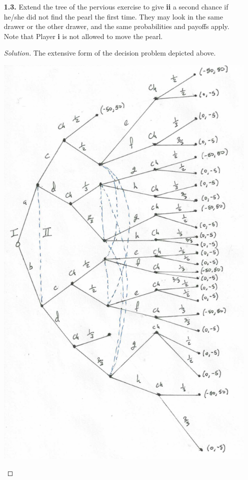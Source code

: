 \documentclass[ 12pt ]{article}
\begin{document}
\begin{enumerate}
\begin{enumerate}
			\item[\textbf{1.3.}] Extend the tree of the pervious exercise to give \textbf{ii} a second chance if he/she did not find the pearl the first time. They may look in the same
				drawer or the other drawer, and the same probabilities and payoffs apply. Note that Player \textbf{i} is not allowed to move the pearl.
				\begin{proof}[Solution]
					The extensive form of the decision problem depicted above.
					\begin{center}
					\includegraphics{tree2}
					\end{center}
				\end{proof}
			\newpage



\end{enumerate}
\end{enumerate}
\end{document}
